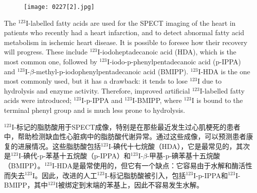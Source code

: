 \documentclass[dvipsnames, svgnames,a4paper,11pt]{article}
\begin{document}
\begin{figure}[h]
	\centering
    \texttt{[image: 0227[2].jpg]}  
     \label{fig302}
\end{figure}

The \(\mathrm{^{123}I}\)-labelled fatty acids are used for the SPECT imaging of the heart in patients who recently had a heart infarction, and to detect abnormal fatty acid metabolism in ischemic heart disease. It is possible to foresee how their recovery will progress. These include \(\mathrm{^{123}I}\)-iodoheptadecanoic acid (HDA), which is the most common one, followed by \(\mathrm{^{123}I}\)-iodo-\(\mathrm{p}\)-phenylpentadecanoic acid (p-IPPA) and \(\mathrm{^{123}I}\)-\(\beta\)-methyl-\(\mathrm{p}\)-iodophenylpentadecanoic acid (BMIPP). \(\mathrm{^{123}I}\)-HDA is the one most commonly used, but it has a drawback: it tends to lose \(\mathrm{^{123}I}\) due to hydrolysis and enzyme activity. Therefore, improved artificial \(\mathrm{^{123}I}\)-labelled fatty acids were introduced; \(\mathrm{^{123}I}\)-p-IPPA and \(\mathrm{^{123}I}\)-BMIPP, where \(\mathrm{^{123}I}\) is bound to the terminal phenyl group and is much less prone to hydrolysis.

\(\mathrm{^{123}I}\)-标记的脂肪酸用于SPECT成像，特别是在那些最近发生过心肌梗死的患者中，帮助检测缺血性心脏病中的脂肪酸代谢异常。通过这些成像，可以预测患者康复的进展情况。这些脂肪酸包括\(\mathrm{^{123}I}\)-碘代十七烷酸（HDA），它是最常见的，其次是\(\mathrm{^{123}I}\)-碘代-\(\mathrm{p}\)-苯基十五烷酸（p-IPPA）和\(\mathrm{^{123}I}\)-\(\beta\)-甲基-\(\mathrm{p}\)-碘苯基十五烷酸（BMIPP）。\(\mathrm{^{123}I}\)-HDA是最常使用的，但它有一个缺点：它容易由于水解和酶活性而失去\(\mathrm{^{123}I}\)。因此，改进的人工\(\mathrm{^{123}I}\)-标记脂肪酸被引入，包括\(\mathrm{^{123}I}\)-p-IPPA和\(\mathrm{^{123}I}\)-BMIPP，其中\(\mathrm{^{123}I}\)被绑定到末端的苯基上，因此不容易发生水解。
\end{document}

